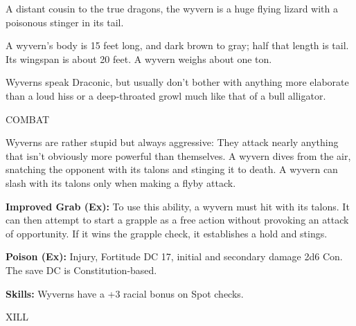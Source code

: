 \documentclass{article}
\begin{document}
A distant cousin to the true dragons, the wyvern is a huge flying lizard with a 
poisonous stinger in its tail.

A wyvern's body is 15 feet long, and dark brown to gray; half that length is tail. 
Its wingspan is about 20 feet. A wyvern weighs about one ton.

Wyverns speak Draconic, but usually don't bother with anything more elaborate than 
a loud hiss or a deep-throated growl much like that of a bull alligator.

COMBAT

Wyverns are rather stupid but always aggressive: They attack nearly anything that 
isn't obviously more powerful than themselves. A wyvern dives from the air, snatching 
the opponent with its talons and stinging it to death. A wyvern can slash with 
its talons only when making a flyby attack.

\textbf{Improved Grab (Ex):} To use this ability, a wyvern must hit with its talons. 
It can then attempt to start a grapple as a free action without provoking an attack 
of opportunity. If it wins the grapple check, it establishes a hold and stings. 

\textbf{Poison (Ex):} Injury, Fortitude DC 17, initial and secondary damage 2d6 
Con. The save DC is Constitution-based.

\textbf{Skills:} Wyverns have a +3 racial bonus on Spot checks.

\vspace{12pt}
{\LARGE{}XILL}
\end{document}
